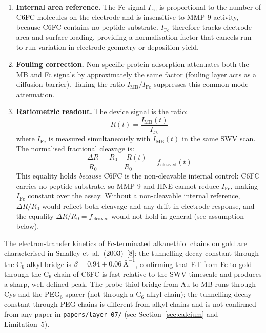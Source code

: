 \documentclass[10pt,a4paper]{article}
\numberwithin{equation}{section}
\newcommand{\cit}[1]{[#1]}   %
\begin{document}
\begin{enumerate}[noitemsep]
  \item \textbf{Internal area reference.} The Fc signal $I_{\text{Fc}}$ is proportional
    to the number of C6FC molecules on the electrode and is insensitive to MMP-9 activity,
    because C6FC contains no peptide substrate. $I_{\text{Fc}}$ therefore tracks
    electrode area and surface loading, providing a normalisation factor that cancels
    run-to-run variation in electrode geometry or deposition yield.
  \item \textbf{Fouling correction.} Non-specific protein adsorption attenuates both
    the MB and Fc signals by approximately the same factor (fouling layer acts as a
    diffusion barrier). Taking the ratio $I_{\text{MB}}/I_{\text{Fc}}$ suppresses this
    common-mode attenuation.
  \item \textbf{Ratiometric readout.} The device signal is the ratio:
    \begin{equation}
      R(t) = \frac{I_{\text{MB}}(t)}{I_{\text{Fc}}}
      \label{eq:ratio}
    \end{equation}
    where $I_{\text{Fc}}$ is measured simultaneously with $I_{\text{MB}}(t)$ in the
    same SWV scan. The normalised fractional cleavage is:
    \begin{equation}
      \frac{\Delta R}{R_0} = \frac{R_0 - R(t)}{R_0} = f_{\text{cleaved}}(t)
      \label{eq:ratio_signal}
    \end{equation}
    This equality holds \emph{because} C6FC is the non-cleavable internal control:
    C6FC carries no peptide substrate, so MMP-9 and HNE cannot reduce $I_{\text{Fc}}$,
    making $I_{\text{Fc}}$ constant over the assay. Without a non-cleavable internal
    reference, $\Delta R/R_0$ would reflect both cleavage and any drift in electrode
    response, and the equality $\Delta R/R_0 = f_{\text{cleaved}}$ would not hold in
    general (see assumption below).
\end{enumerate}

The electron-transfer kinetics of Fc-terminated alkanethiol chains on gold are
characterised in Smalley et~al.\ (2003)~\cit{8}: the tunnelling decay constant through
the C$_6$ alkyl bridge is $\beta = 0.94 \pm 0.06\ \text{\AA}^{-1}$, confirming that
ET from Fc to gold through the C$_6$ chain of C6FC is fast relative to the SWV
timescale and produces a sharp, well-defined peak. The probe-thiol bridge from Au
to MB runs through Cys and the PEG$_6$ spacer (not through a C$_6$ alkyl chain);
the tunnelling decay constant through PEG chains is different from alkyl chains and
is not confirmed from any paper in \texttt{papers/layer\_07/}
(see Section~\ref{sec:calcium} and Limitation~5).
\end{document}
